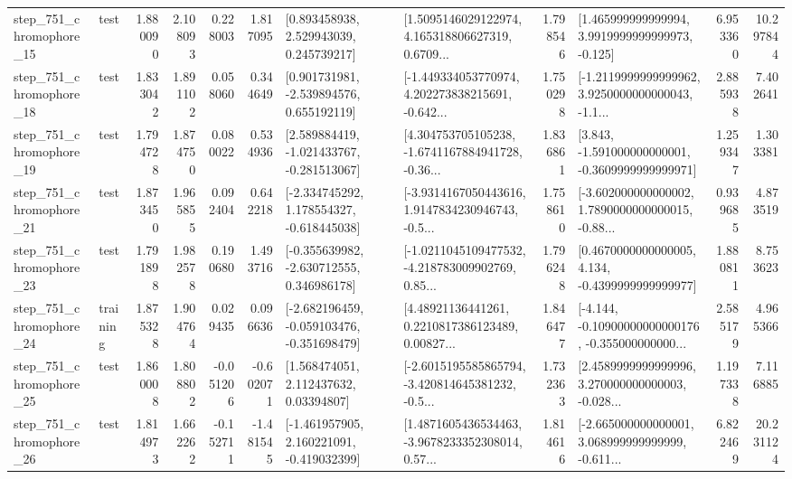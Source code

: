 \begin{tabular}{llrrrrllrlrr}
  step\_751\_chromophore\_15 &      test &      1.880090 &    2.108093 &      0.228003 &  1.817095 &     [0.893458938, 2.529943039, 0.245739217] &  [1.5095146029122974, 4.165318806627319, 0.6709... &       1.798546 &    [1.465999999999994, 3.9919999999999973, -0.125] &            6.953360 &         10.297844 \\
  step\_751\_chromophore\_18 &      test &      1.833042 &    1.891102 &      0.058060 &  0.344649 &    [0.901731981, -2.539894576, 0.655192119] &  [-1.449334053770974, 4.202273838215691, -0.642... &       1.750298 &  [-1.2119999999999962, 3.9250000000000043, -1.1... &            2.885938 &          7.402641 \\
  step\_751\_chromophore\_19 &      test &      1.794728 &    1.874750 &      0.080022 &  0.534936 &   [2.589884419, -1.021433767, -0.281513067] &  [4.304753705105238, -1.6741167884941728, -0.36... &       1.836861 &   [3.843, -1.591000000000001, -0.3609999999999971] &            1.259347 &          1.303381 \\
  step\_751\_chromophore\_21 &      test &      1.873450 &    1.965855 &      0.092404 &  0.642218 &   [-2.334745292, 1.178554327, -0.618445038] &  [-3.9314167050443616, 1.9147834230946743, -0.5... &       1.758610 &  [-3.602000000000002, 1.7890000000000015, -0.88... &            0.939685 &          4.873519 \\
  step\_751\_chromophore\_23 &      test &      1.791898 &    1.982578 &      0.190680 &  1.493716 &   [-0.355639982, -2.630712555, 0.346986178] &  [-1.0211045109477532, -4.218783009902769, 0.85... &       1.796248 &   [0.4670000000000005, 4.134, -0.4399999999999977] &            1.880811 &          8.753623 \\
  step\_751\_chromophore\_24 &  training &      1.875328 &    1.904764 &      0.029435 &  0.096636 &  [-2.682196459, -0.059103476, -0.351698479] &  [4.48921136441261, 0.2210817386123489, 0.00827... &       1.846477 &  [-4.144, -0.10900000000000176, -0.355000000000... &            2.585179 &          4.965366 \\
  step\_751\_chromophore\_25 &      test &      1.860008 &    1.808802 &     -0.051206 & -0.602071 &      [1.568474051, 2.112437632, 0.03394807] &  [-2.6015195585865794, -3.420814645381232, -0.5... &       1.732363 &  [2.4589999999999996, 3.270000000000003, -0.028... &            1.197338 &          7.116885 \\
  step\_751\_chromophore\_26 &      test &      1.814973 &    1.662262 &     -0.152711 & -1.481545 &   [-1.461957905, 2.160221091, -0.419032399] &  [1.4871605436534463, -3.9678233352308014, 0.57... &       1.814616 &  [-2.665000000000001, 3.068999999999999, -0.611... &            6.822469 &         20.231124 \\

\end{tabular}
